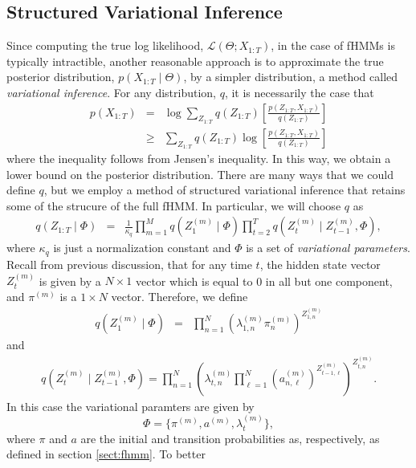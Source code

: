 \documentclass{amsart}
\begin{document}
\subsection{Structured Variational Inference}

Since computing the true log likelihood, $\mathcal L (\Theta; X_{1:T})$, 
in the case of fHMMs is typically intractible, another reasonable approach is to approximate 
the true posterior distribution, $p(X_{1:T}\mid \Theta)$, by a 
simpler distribution, a method called {\em variational inference}. For 
any distribution, $q$, it is necessarily the case that 
\begin{eqnarray*}
p(X_{1:T}) & =& 
\log\sum_{Z_{1:T}}q(Z_{1:T})\left[\frac{p(Z_{1:T},X_{1:T})}{q(Z_{1:T})}\right]\\
&\geq& 
\sum_{Z_{1:T}}q(Z_{1:T})\log \left[\frac{p(Z_{1:T},X_{1:T})}{q(Z_{1:T})}\right]
\end{eqnarray*} 
where the inequality follows from Jensen's inequality.  In this way, we 
obtain a lower bound on the posterior distribution. There are many ways 
that we could define $q$, but we employ a method of structured 
variational inference that retains some of the strucure of the full 
fHMM.  In particular, we will choose $q$ as 
\begin{eqnarray}\label{eqn:11a}
q(Z_{1:T}\mid \Phi) &=& \frac{1}{\kappa_q}\prod_{m=1}^M q(Z_1^{(m)}\mid 
\Phi)\prod_{t=2}^T q(Z_t^{(m)}\mid Z_{t-1}^{(m)}, \Phi),
\end{eqnarray}
where $\kappa_q$ is just a normalization constant and $\Phi$ is a set 
of {\em variational parameters}. Recall from previous discussion, that 
for any time $t$, the hidden state vector $Z_t^{(m)}$ is given by a 
$N\times 1$ vector which is equal to 0 in all but one component, and 
$\pi^{(m)}$ is a $1\times N$ vector. Therefore, we  
define 
\begin{eqnarray}\label{eqn:11b}
q(Z_1^{(m)}\mid \Phi) &=& 
\prod_{n=1}^N\left(\lambda_{1,n}^{(m)}\pi_n^{(m)}\right)^{Z_{1,n}^{(m)}}
\end{eqnarray}
and 
\begin{eqnarray}\label{eqn:11c}
q(Z_t^{(m)}\mid Z_{t-1}^{(m)},\Phi) = 
\prod_{n=1}^N\left(\lambda_{t,n}^{(m)}\prod_{\ell=1}^N 
\left(a_{n,\ell}^{(m)}\right)^{Z_{t-1,\ell}^{(m)}}\right)^{Z_{t,n}^{(m)}}.
\end{eqnarray}
In this case the variational paramters are given by 
\[
\Phi = \{\pi^{(m)}, a^{(m)}, \lambda_t^{(m)}\},
\]
where $\pi$ and $a$ are the initial and transition probabilities as, 
respectively, as defined in section \ref{sect:fhmm}.  To better 
\end{document}
